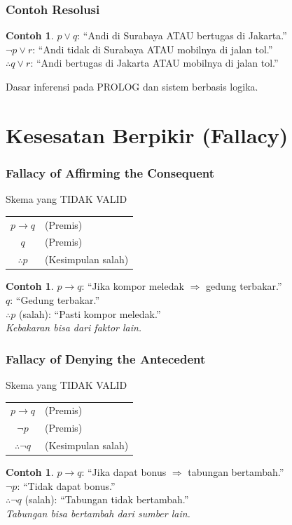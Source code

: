 \documentclass[handout]{beamer}
\theoremstyle{definition}
\theoremstyle{example}
\newtheorem{contoh}[theorem]{Contoh}
\begin{document}
\begin{frame}
\frametitle{Contoh Resolusi}
\begin{contoh}
$p \vee q$: ``Andi di Surabaya ATAU bertugas di Jakarta.''\\
$\neg p \vee r$: ``Andi tidak di Surabaya ATAU mobilnya di jalan tol.''\\
$\therefore q \vee r$: ``Andi bertugas di Jakarta ATAU mobilnya di jalan tol.''
\end{contoh}
\begin{block}{}
Dasar inferensi pada PROLOG dan sistem berbasis logika.
\end{block}
\end{frame}

\section{Kesesatan Berpikir (Fallacy)}

\begin{frame}
\frametitle{Fallacy of Affirming the Consequent}
\begin{block}{Skema yang TIDAK VALID}
\begin{tabular}{cl}
$p \rightarrow q$ & (Premis) \\
$q$ & (Premis) \\
\hline
$\therefore p$ & (Kesimpulan salah)
\end{tabular}
\end{block}
\begin{contoh}
$p \rightarrow q$: ``Jika kompor meledak $\Rightarrow$ gedung terbakar.''\\
$q$: ``Gedung terbakar.''\\
$\therefore p$ (salah): ``Pasti kompor meledak.''\\
\textit{Kebakaran bisa dari faktor lain.}
\end{contoh}
\end{frame}

\begin{frame}
\frametitle{Fallacy of Denying the Antecedent}
\begin{block}{Skema yang TIDAK VALID}
\begin{tabular}{cl}
$p \rightarrow q$ & (Premis) \\
$\neg p$ & (Premis) \\
\hline
$\therefore \neg q$ & (Kesimpulan salah)
\end{tabular}
\end{block}
\begin{contoh}
$p \rightarrow q$: ``Jika dapat bonus $\Rightarrow$ tabungan bertambah.''\\
$\neg p$: ``Tidak dapat bonus.''\\
$\therefore \neg q$ (salah): ``Tabungan tidak bertambah.''\\
\textit{Tabungan bisa bertambah dari sumber lain.}
\end{contoh}
\end{frame}
\end{document}
